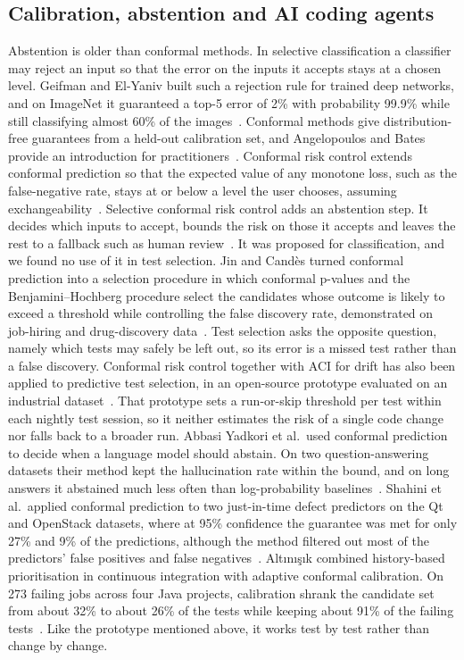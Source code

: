\documentclass[11pt]{article}
\begin{document}
\subsection*{Calibration, abstention and AI coding agents}
Abstention is older than conformal methods. In selective classification a classifier may reject an input so that the error on the inputs it accepts stays at a chosen level. Geifman and El-Yaniv built such a rejection rule for trained deep networks, and on ImageNet it guaranteed a top-5 error of 2\% with probability 99.9\% while still classifying almost 60\% of the images~\cite{geifman2017selective}. Conformal methods give distribution-free guarantees from a held-out calibration set, and Angelopoulos and Bates provide an introduction for practitioners~\cite{angelopoulos2023gentle}. Conformal risk control extends conformal prediction so that the expected value of any monotone loss, such as the false-negative rate, stays at or below a level the user chooses, assuming exchangeability~\cite{angelopoulos2024crc}. Selective conformal risk control adds an abstention step. It decides which inputs to accept, bounds the risk on those it accepts and leaves the rest to a fallback such as human review~\cite{xu2026scrc}. It was proposed for classification, and we found no use of it in test selection. Jin and Cand\`es turned conformal prediction into a selection procedure in which conformal p-values and the Benjamini--Hochberg procedure select the candidates whose outcome is likely to exceed a threshold while controlling the false discovery rate, demonstrated on job-hiring and drug-discovery data~\cite{jin2023selection}. Test selection asks the opposite question, namely which tests may safely be left out, so its error is a missed test rather than a false discovery. Conformal risk control together with ACI for drift has also been applied to predictive test selection, in an open-source prototype evaluated on an industrial dataset~\cite{crcpts2026}. That prototype sets a run-or-skip threshold per test within each nightly test session, so it neither estimates the risk of a single code change nor falls back to a broader run. Abbasi Yadkori et al.\ used conformal prediction to decide when a language model should abstain. On two question-answering datasets their method kept the hallucination rate within the bound, and on long answers it abstained much less often than log-probability baselines~\cite{yadkori2024abstention}. Shahini et al.\ applied conformal prediction to two just-in-time defect predictors on the Qt and OpenStack datasets, where at 95\% confidence the guarantee was met for only 27\% and 9\% of the predictions, although the method filtered out most of the predictors' false positives and false negatives~\cite{shahini2024jitcp}. Alt{\i}n{\i}{\c{s}}{\i}k combined history-based prioritisation in continuous integration with adaptive conformal calibration. On 273 failing jobs across four Java projects, calibration shrank the candidate set from about 32\% to about 26\% of the tests while keeping about 91\% of the failing tests~\cite{altinisik2026conformal}. Like the prototype mentioned above, it works test by test rather than change by change.
\end{document}
